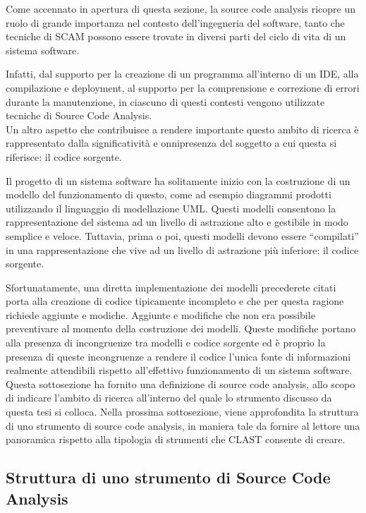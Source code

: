 Come accennato in apertura di questa sezione, la source code analysis ricopre
un ruolo di grande importanza nel contesto dell'ingegneria del software, tanto
che tecniche di SCAM possono essere trovate in diversi parti del ciclo di vita
di un sistema software.

Infatti, dal supporto per la creazione di un programma all’interno di un IDE,
alla compilazione e deployment, al supporto per la comprensione e correzione di
errori durante la manutenzione, in ciascuno di questi contesti vengono
utilizzate tecniche di Source Code Analysis.\\

Un altro aspetto che contribuisce a rendere importante questo ambito di ricerca
è rappresentato dalla significatività e onnipresenza del soggetto a cui questa
si riferisce: il codice sorgente.

Il progetto di un sistema software ha solitamente inizio con la costruzione di
un modello del funzionamento di questo, come ad esempio diagrammi prodotti
utilizzando il linguaggio di modellazione UML. Questi modelli consentono la
rappresentazione del sistema ad un livello di astrazione alto e gestibile in
modo semplice e veloce. Tuttavia, prima o poi, questi modelli devono essere
“compilati” in una rappresentazione che vive ad un livello di astrazione più
inferiore: il codice sorgente.

Sfortunatamente, una diretta implementazione dei modelli precederete citati
porta alla creazione di codice tipicamente incompleto e che per questa ragione
richiede aggiunte e modiche. Aggiunte e modifiche che non era possibile
preventivare al momento della costruzione dei modelli. Queste modifiche portano
alla presenza di incongruenze tra modelli e codice sorgente ed è proprio la
presenza di queste incongruenze a rendere il codice l’unica fonte di
informazioni realmente attendibili rispetto all’effettivo funzionamento di un
sistema software.\\

Questa sottosezione ha fornito una definizione di source code analysis, allo
scopo di indicare l'ambito di ricerca all'interno del quale lo strumento
discusso da questa tesi si colloca. Nella prossima sottosezione, viene
approfondita la struttura di uno strumento di source code analysis, in maniera
tale da fornire al lettore una panoramica rispetto alla tipologia di strumenti
che CLAST consente di creare.

\subsection{Struttura di uno strumento di Source Code Analysis}

